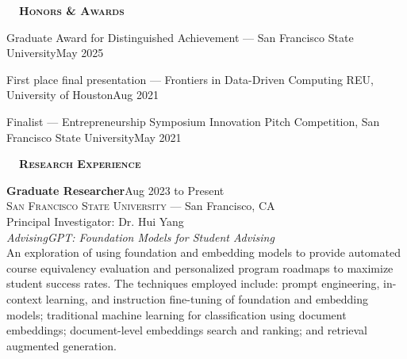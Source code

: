\documentclass[hidelinks, 10pt]{article}
\def\contentwidth{0.9\linewidth}    %
\def\contentblockspacing{2.5mm}     %
\def\contentheaderspacing{1mm}      %
\def\sectionspacing{8mm}            %
\def\sectiontocontentspacing{4mm}   %
\renewcommand{\section}[1]{
    {\fontsize{14}{14}\selectfont \textsc{\textbf{\ \ #1\ \ }}}\hrulefill
}
\begin{document}
{%

\section{Honors \& Awards}

\vspace{\sectiontocontentspacing}

\begin{minipage}[ct]{\contentwidth}
    Graduate Award for Distinguished Achievement --- San Francisco State University\hfill May 2025
\end{minipage}

\vspace{\contentblockspacing}

\begin{minipage}[ct]{\contentwidth}
    First place final presentation --- Frontiers in Data-Driven Computing REU,
    University of Houston\hfill Aug 2021
\end{minipage}

\vspace{\contentblockspacing}

\begin{minipage}[ct]{\contentwidth}
    Finalist --- Entrepreneurship Symposium Innovation Pitch Competition, San
    Francisco State University\hfill May 2021
\end{minipage}

\vspace{\sectionspacing}


\section{Research Experience}

\vspace{\sectiontocontentspacing}

\begin{minipage}[ct]{\contentwidth}
    \textbf{Graduate Researcher}\hfill Aug 2023 to Present\\
    \textsc{San Francisco State University} --- San Francisco, CA\\
    Principal Investigator: Dr. Hui Yang
    \vspace{\contentheaderspacing}\\
    {\textit{AdvisingGPT: Foundation Models for Student Advising}}\\
    An exploration of using foundation and embedding models to provide automated course equivalency evaluation and personalized program
    roadmaps to maximize student success rates. The techniques employed include: prompt engineering, in-context learning, and instruction
    fine-tuning of foundation and embedding models; traditional machine learning for classification using document embeddings;
    document-level embeddings search and ranking; and retrieval augmented generation.
\end{minipage}

}
\end{document}
